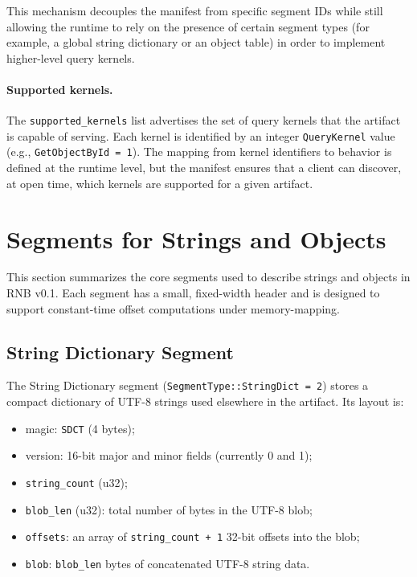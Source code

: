 \documentclass[11pt]{article}
\begin{document}
This mechanism decouples the manifest from specific segment IDs while
still allowing the runtime to rely on the presence of certain segment
types (for example, a global string dictionary or an object table) in
order to implement higher-level query kernels.

\paragraph{Supported kernels.}
The \verb|supported_kernels| list advertises the set of query kernels
that the artifact is capable of serving. Each kernel is identified by
an integer \texttt{QueryKernel} value (e.g.,
\texttt{GetObjectById = 1}). The mapping from kernel identifiers to
behavior is defined at the runtime level, but the manifest ensures
that a client can discover, at open time, which kernels are supported
for a given artifact.

\section{Segments for Strings and Objects}

This section summarizes the core segments used to describe strings and
objects in RNB v0.1. Each segment has a small, fixed-width header and
is designed to support constant-time offset computations under
memory-mapping.

\subsection{String Dictionary Segment}

The String Dictionary segment (\texttt{SegmentType::StringDict = 2})
stores a compact dictionary of UTF-8 strings used elsewhere in the
artifact. Its layout is:
\begin{itemize}
  \item magic: \verb|SDCT| (4 bytes);
  \item version: 16-bit major and minor fields (currently 0 and 1);
  \item \verb|string_count| (u32);
  \item \verb|blob_len| (u32): total number of bytes in the UTF-8 blob;
  \item \verb|offsets|: an array of \verb|string_count + 1| 32-bit
        offsets into the blob;
  \item \verb|blob|: \verb|blob_len| bytes of concatenated UTF-8
        string data.
\end{itemize}
\end{document}
